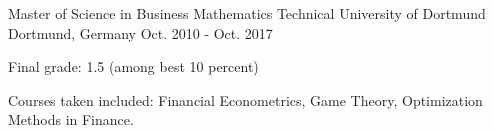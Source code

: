 

\begin{cventries}


  \cventry
    {Master of Science in Business Mathematics} %
    {Technical University of Dortmund} %
    {Dortmund, Germany} %
    {Oct. 2010 - Oct. 2017} %
    {
      \begin{cvitems} %
        \item {Final grade: 1.5 (among best 10 percent)}
        \item {Courses taken included: Financial Econometrics, Game Theory, Optimization Methods in Finance.}
      \end{cvitems}
    }


\end{cventries}

